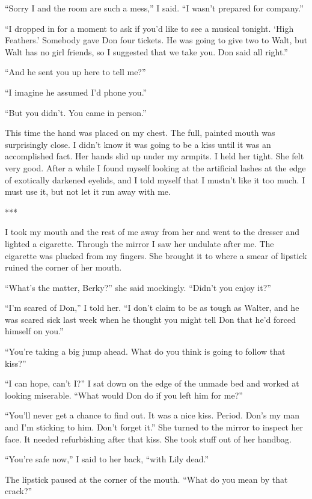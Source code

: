 {“Sorry I and the room are such a mess,” I said. “I wasn’t prepared for company.”

“I dropped in for a moment to ask if you’d like to see a musical tonight. ‘High Feathers.’ Somebody gave Don four tickets. He was going to give two to Walt, but Walt has no girl friends, so I suggested that we take you. Don said all right.”

“And he sent you up here to tell me?”

“I imagine he assumed I’d phone you.”

“But you didn’t. You came in person.”

This time the hand was placed on my chest. The full, painted mouth was surprisingly close. I didn’t know it was going to be a kiss until it was an accomplished fact. Her hands slid up under my armpits. I held her tight. She felt very good. After a while I found myself looking at the artificial lashes at the edge of exotically darkened eyelids, and I told myself that I mustn’t like it too much. I must use it, but not let it run away with me.

***

I took my mouth and the rest of me away from her and went to the dresser and lighted a cigarette. Through the mirror I saw her undulate after me. The cigarette was plucked from my fingers. She brought it to where a smear of lipstick ruined the corner of her mouth.

“What’s the matter, Berky?” she said mockingly. “Didn’t you enjoy it?”

“I’m scared of Don,” I told her. “I don’t claim to be as tough as Walter, and he was scared sick last week when he thought you might tell Don that he’d forced himself on you.”

“You’re taking a big jump ahead. What do you think is going to follow that kiss?”

“I can hope, can’t I?” I sat down on the edge of the unmade bed and worked at looking miserable. “What would Don do if you left him for me?”

“You’ll never get a chance to find out. It was a nice kiss. Period. Don’s my man and I’m sticking to him. Don’t forget it.” She turned to the mirror to inspect her face. It needed refurbishing after that kiss. She took stuff out of her handbag.

“You’re safe now,” I said to her back, “with Lily dead.”

The lipstick paused at the corner of the mouth. “What do you mean by that crack?”

}
